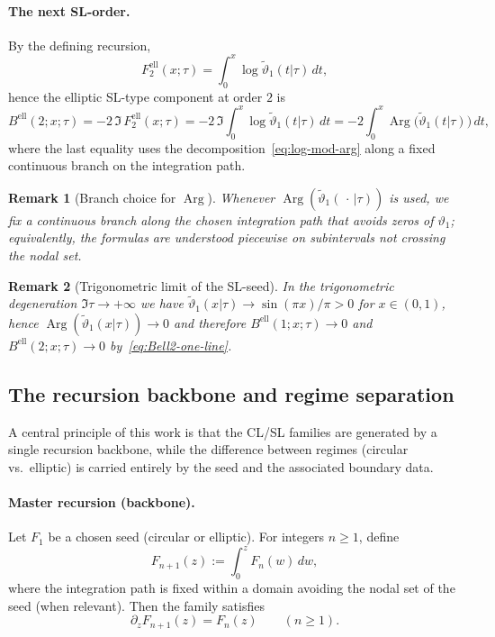 \documentclass[11pt]{article}
\newtheorem{remark}{Remark}
\DeclareMathOperator{\Arg}{Arg}
\begin{document}
\paragraph{The next SL-order.}
By the defining recursion,
\[
F^{\mathrm{ell}}_2(x;\tau)=\int_0^x \log \widetilde{\vartheta}_1(t|\tau)\,dt,
\]
hence the elliptic SL-type component at order $2$ is
\begin{equation}\label{eq:Bell2-one-line}
B^{\mathrm{ell}}(2;x;\tau)
=
-2\,\Im\,F^{\mathrm{ell}}_2(x;\tau)
=
-2\,\Im\int_0^x \log \widetilde{\vartheta}_1(t|\tau)\,dt
=
-2\int_0^x \Arg\!\bigl(\widetilde{\vartheta}_1(t|\tau)\bigr)\,dt,
\end{equation}
where the last equality uses the decomposition~\eqref{eq:log-mod-arg} along a fixed continuous branch on the integration path.


\begin{remark}[Branch choice for $\Arg$]
Whenever $\Arg(\widetilde{\vartheta}_1(\,\cdot\,|\tau))$ is used, we fix a continuous branch along the chosen integration path that avoids zeros of $\vartheta_1$; equivalently, the formulas are understood piecewise on subintervals not crossing the nodal set.
\end{remark}


\begin{remark}[Trigonometric limit of the SL-seed]
In the trigonometric degeneration $\Im\tau\to+\infty$ we have $\widetilde{\vartheta}_1(x|\tau)\to \sin(\pi x)/\pi>0$ for $x\in(0,1)$, hence $\Arg(\widetilde{\vartheta}_1(x|\tau))\to0$ and therefore $B^{\mathrm{ell}}(1;x;\tau)\to0$ and $B^{\mathrm{ell}}(2;x;\tau)\to0$ by~\eqref{eq:Bell2-one-line}.
\end{remark}


\subsection{The recursion backbone and regime separation}

A central principle of this work is that the CL/SL families are generated by a
single recursion backbone, while the difference between regimes (circular vs.\ elliptic)
is carried entirely by the seed and the associated boundary data.

\paragraph{Master recursion (backbone).}
Let $F_{1}$ be a chosen seed (circular or elliptic).
For integers $n\ge1$, define
\begin{equation}\label{eq:backbone-int}
F_{n+1}(z):=\int_{0}^{z} F_{n}(w)\,dw,
\end{equation}
where the integration path is fixed within a domain avoiding the nodal set of the seed
(when relevant). Then the family satisfies
\begin{equation}\label{eq:backbone-diff}
\partial_z F_{n+1}(z)=F_n(z)\qquad(n\ge1).
\end{equation}
\end{document}
